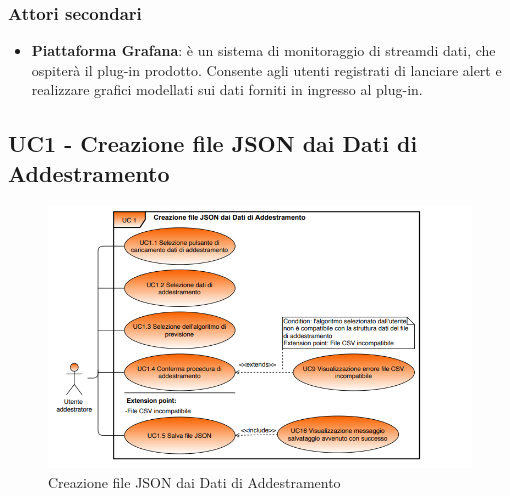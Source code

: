 	\subsubsection{Attori secondari}
	\begin{itemize}
		\item\textbf{Piattaforma Grafana}: è un sistema di monitoraggio di stream\glo di dati, che ospiterà il plug-in prodotto. Consente agli utenti registrati di lanciare alert e realizzare grafici modellati sui dati forniti in ingresso al plug-in.
 	\end{itemize}

	\label{par:UC1}
	\subsection{UC1 - Creazione file JSON dai Dati di Addestramento}

	\begin{figure}[H]
		\centering
		\includegraphics[scale=0.70]{../Analisi_dei_requisiti/img/Diagrammi_UML/UC1_tool_di_addestramento.png}
		\caption{Creazione file JSON dai Dati di Addestramento}
	\end{figure}	

